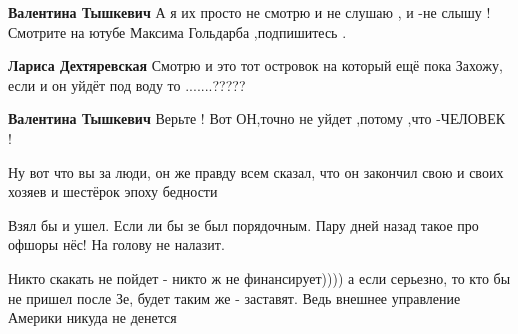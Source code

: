 \begin{itemize}
\begin{itemize} %
\textbf{Валентина Тышкевич} А я их просто не смотрю и не слушаю , и -не слышу ! Смотрите на ютубе Максима Гольдарба ,подпишитесь .

\textbf{Лариса Дехтяревская} Смотрю и это тот островок на который ещё пока Захожу, если и он уйдёт под воду то .......?????

\textbf{Валентина Тышкевич} Верьте ! Вот ОН,точно не уйдет ,потому ,что -ЧЕЛОВЕК !
\end{itemize} %

Ну вот что вы за люди, он же правду всем сказал, что он закончил свою и своих хозяев и шестёрок эпоху бедности

Взял бы и ушел. Если ли бы зе был порядочным. Пару дней назад такое про офшоры нёс! На голову не налазит.


Никто скакать не пойдет - никто ж не финансирует)))) а если серьезно, то кто бы
не пришел после Зе, будет таким же - заставят. Ведь внешнее управление Америки
никуда не денется


\end{itemize} %
